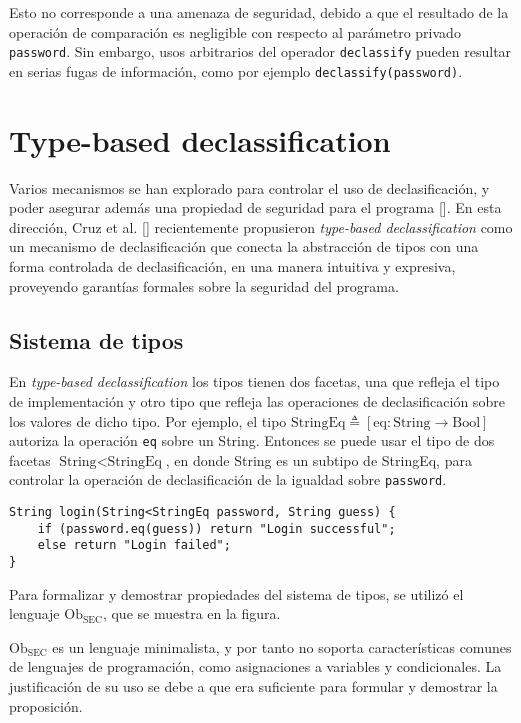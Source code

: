 	Esto no corresponde a una amenaza de seguridad, debido a que el resultado de la operación de comparación es negligible con respecto al parámetro privado \texttt{password}. Sin embargo, usos arbitrarios del operador \texttt{declassify} pueden resultar en serias fugas de información, como por ejemplo \texttt{declassify(password)}.

	\section{Type-based declassification}

	Varios mecanismos se han explorado para controlar el uso de declasificación, y poder asegurar además una propiedad de seguridad para el programa []. En esta dirección, Cruz et al. [] recientemente propusieron \textit{type-based declassification} como un mecanismo de declasificación que conecta la abstracción de tipos con una forma controlada de declasificación, en una manera intuitiva y expresiva, proveyendo garantías formales sobre la seguridad del programa. %

	\subsection{Sistema de tipos}

	En \textit{type-based declassification} los tipos tienen dos facetas, una que refleja el tipo de implementación y otro tipo que refleja las operaciones de declasificación sobre los valores de dicho tipo. Por ejemplo, el tipo $\text{StringEq} \triangleq [\text{eq} : \text{String} \rightarrow \text{Bool}]$ autoriza la operación \texttt{eq} sobre un String. Entonces se puede usar el tipo de dos facetas $\text{String} < \text{StringEq}$, en donde String es un subtipo de StringEq, para controlar la operación de declasificación de la igualdad sobre \texttt{password}.

	\begin{lstlisting}
String login(String<StringEq password, String guess) {
	if (password.eq(guess)) return "Login successful";
	else return "Login failed";
}
	\end{lstlisting}

	Para formalizar y demostrar propiedades del sistema de tipos, se utilizó el lenguaje $\text{Ob}_{\text{SEC}}$, que se muestra en la figura. %

	$\text{Ob}_{\text{SEC}}$ es un lenguaje minimalista, y por tanto no soporta características comunes de lenguajes de programación, como asignaciones a variables y condicionales. La justificación de su uso se debe a que era suficiente para formular y demostrar la proposición.

